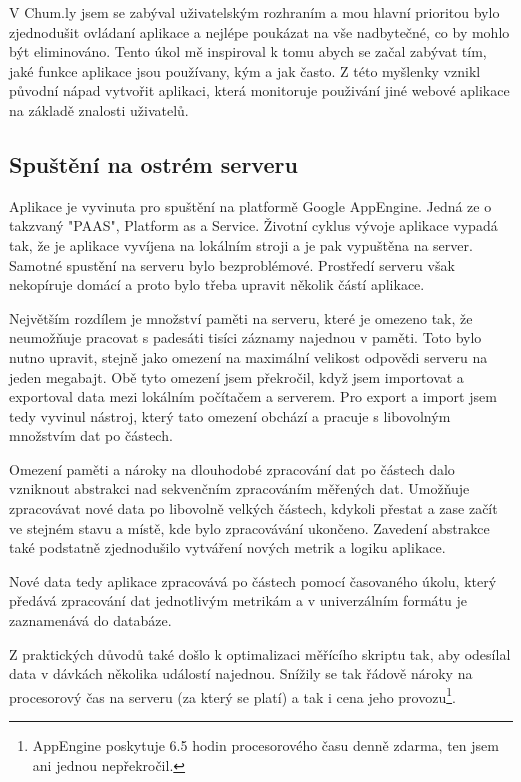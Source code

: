 \documentclass[bc,male,java,dept456]{diploma}						%
\begin{document}
V Chum.ly jsem se zabýval uživatelským rozhraním a mou hlavní prioritou bylo zjednodušit ovládaní aplikace a nejlépe poukázat na vše nadbytečné, co by mohlo být eliminováno. Tento úkol mě inspiroval k tomu abych se začal zabývat tím, jaké funkce aplikace jsou používany, kým a jak často. Z této myšlenky vznikl původní nápad vytvořit aplikaci, která monitoruje použivání jiné webové aplikace na základě znalosti uživatelů.


\subsection{Spuštění na ostrém serveru}

Aplikace je vyvinuta pro spuštění na platformě Google AppEngine. Jedná ze o takzvaný "PAAS", Platform as a Service. Životní cyklus vývoje aplikace vypadá tak, že je aplikace vyvíjena na lokálním stroji a je pak vypuštěna na server. Samotné spustění na serveru bylo bezproblémové. Prostředí serveru však nekopíruje domácí a proto bylo třeba upravit několik částí aplikace.

Největším rozdílem je množství paměti na serveru, které je omezeno tak, že ne\-u\-mo\-žňu\-je pracovat s padesáti tisíci záznamy najednou v paměti. Toto bylo nutno upravit, stejně jako omezení na maximální velikost odpovědi serveru na jeden megabajt. Obě tyto omezení jsem překročil, když jsem importovat a exportoval data mezi lokálním počítačem a serverem. Pro export a import jsem tedy vyvinul nástroj, který tato omezení obchází a pracuje s libovolným množstvím dat po částech.

Omezení paměti a nároky na dlouhodobé zpracování dat po částech dalo vzniknout abstrakci nad sekvenčním zpracováním měřených dat. Umožňuje zpracovávat nové data po libovolně velkých částech, kdykoli přestat a zase začít ve stejném stavu a místě, kde bylo zpracovávání ukončeno. Zavedení abstrakce také podstatně zjednodušilo vytváření nových metrik a logiku aplikace.

Nové data tedy aplikace zpracovává po částech pomocí časovaného úkolu, který předává zpracování dat jednotlivým metrikám a v univerzálním formátu je zaznamenává do databáze.

Z praktických důvodů také došlo k optimalizaci měřícího skriptu tak, aby odesílal data v dávkách několika událostí najednou. Snížily se tak řádově nároky na procesorový čas na serveru (za který se platí) a tak i cena jeho provozu\footnote{AppEngine poskytuje 6.5 hodin procesorového času denně zdarma, ten jsem ani jednou nepřekročil.}.
\end{document}
